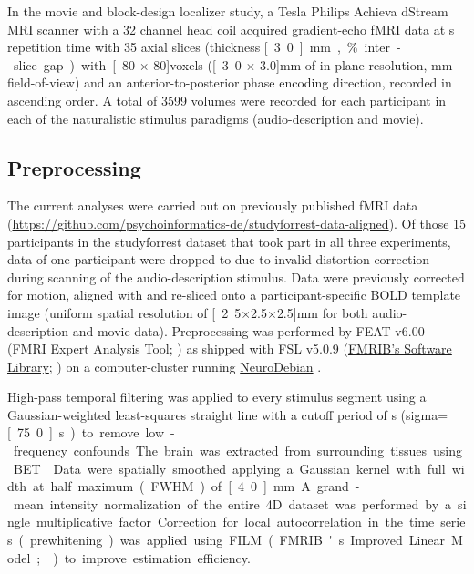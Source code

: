 \documentclass[english]{article}
\begin{document}
In the movie and block-design localizer study, a \unit[3]{Tesla} Philips Achieva dStream
MRI scanner with a 32 channel head coil acquired gradient-echo fMRI data
at \unit[2]{s} repetition time with
35 axial slices (thickness \unit[3.0]{mm}, \unit[10]{\%} inter-slice gap) with
\unit[80 $\times$ 80]{voxels} (\unit[3.0 $\times$ 3.0]{mm} of in-plane
resolution, \unit[240]{mm} field-of-view) and an anterior-to-posterior phase
encoding direction, recorded in ascending order.
A total of 3599 volumes were recorded for each participant in each of the
naturalistic stimulus paradigms (audio-description and movie).

\subsection{Preprocessing}

The current analyses were carried out on previously published fMRI data
(\url{https://github.com/psychoinformatics-de/studyforrest-data-aligned}).
Of those 15 participants in the studyforrest dataset that took
part in all three experiments,
data of one participant were dropped to due to invalid distortion correction
during scanning of the audio-description stimulus.
Data were previously corrected for motion, aligned with and re-sliced onto a
participant-specific BOLD template image \citep{sengupta2016extension}
(uniform spatial resolution of \unit[2.5$\times$2.5$\times$2.5]{mm} for both
audio-description and movie data).
Preprocessing was performed by FEAT v6.00 (FMRI Expert Analysis Tool;
\citep{woolrich2001autocorr}) as shipped with
FSL v5.0.9 (\href{https://www.fmrib.ox.ac.uk/fsl}{FMRIB's Software Library};
\citep{smith2004fsl}) on a computer-cluster running
\href{http://neuro.debian.net}{NeuroDebian} \citep{halchenko2012open}.

High-pass temporal filtering was applied to every stimulus segment using a
Gaussian-weighted least-squares straight line with a cutoff period of
\unit[150]{s} (sigma=\unit[75.0]{s}) to remove low-frequency confounds.
The brain was extracted from surrounding tissues using BET \citep{smith2002bet}.
Data were spatially smoothed applying a Gaussian kernel with full width at half
maximum (FWHM) of \unit[4.0]{mm}.
A grand-mean intensity normalization of the entire 4D dataset was performed by a
single multiplicative factor.
Correction for local autocorrelation in the time series (prewhitening) was
applied using FILM (FMRIB's Improved Linear Model; \citep{woolrich2001autocorr})
to improve estimation efficiency.
\end{document}
